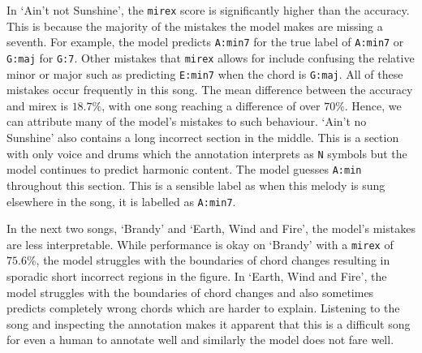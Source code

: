 In `Ain't not Sunshine', the \texttt{mirex} score is significantly higher than the accuracy. This is because the majority of the mistakes the model makes are missing a seventh. For example, the model predicts \texttt{A:min7} for the true label of \texttt{A:min7} or \texttt{G:maj} for \texttt{G:7}. Other mistakes that \texttt{mirex} allows for include confusing the relative minor or major such as predicting \texttt{E:min7} when the chord is \texttt{G:maj}. All of these mistakes occur frequently in this song. The mean difference between the accuracy and mirex is $18.7\%$, with one song reaching a difference of over $70\%$. Hence, we can attribute many of the model's mistakes to such behaviour. `Ain't no Sunshine' also contains a long incorrect section in the middle. This is a section with only voice and drums which the annotation interprets as \texttt{N} symbols but the model continues to predict harmonic content. The model guesses \texttt{A:min} throughout this section. This is a sensible label as when this melody is sung elsewhere in the song, it is labelled as \texttt{A:min7}.

In the next two songs, `Brandy' and `Earth, Wind and Fire', the model's mistakes are less interpretable. While performance is okay on `Brandy' with a \texttt{mirex} of $75.6\%$, the model struggles with the boundaries of chord changes resulting in sporadic short incorrect regions in the figure. In `Earth, Wind and Fire', the model struggles with the boundaries of chord changes and also sometimes predicts completely wrong chords which are harder to explain. Listening to the song and inspecting the annotation makes it apparent that this is a difficult song for even a human to annotate well and similarly the model does not fare well.

